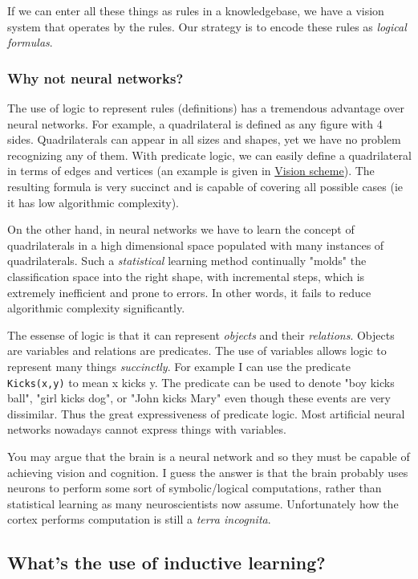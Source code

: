If we can enter all these things as rules in a knowledgebase, we have a vision system that operates by the rules. Our strategy is to encode these rules as \emph{logical formulas}.

\subsubsection{Why not neural networks? }

The use of logic to represent rules (definitions) has a tremendous advantage over neural networks. For example, a quadrilateral is defined as any figure with 4 sides. Quadrilaterals can appear in all sizes and shapes, yet we have no problem recognizing any of them. With predicate logic, we can easily define a quadrilateral in terms of edges and vertices (an example is given in \href{Vis-BasicScheme.htm}{Vision scheme}). The resulting formula is very succinct and is capable of covering all possible cases (ie it has low algorithmic complexity).

On the other hand, in neural networks we have to learn the concept of quadrilaterals in a high dimensional space populated with many instances of quadrilaterals. Such a \emph{statistical} learning method continually "molds" the classification space into the right shape, with incremental steps, which is extremely inefficient and prone to errors. In other words, it fails to reduce algorithmic complexity significantly.

The essense of logic is that it can represent \emph{objects} and their \emph{relations}. Objects are variables and relations are predicates. The use of variables allows logic to represent many things \emph{succinctly}. For example I can use the predicate \texttt{Kicks(x,y)} to mean x kicks y. The predicate can be used to denote "boy kicks ball", "girl kicks dog", or "John kicks Mary" even though these events are very dissimilar. Thus the great expressiveness of predicate logic. Most artificial neural networks nowadays cannot express things with variables.

You may argue that the brain is a neural network and so they must be capable of achieving vision and cognition. I guess the answer is that the brain probably uses neurons to perform some sort of symbolic/logical computations, rather than statistical learning as many neuroscientists now assume. Unfortunately how the cortex performs computation is still a \emph{terra incognita}.

\subsection{What's the use of inductive learning?}

